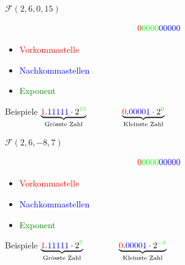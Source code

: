 \ifnum\conditionmacro=1 \documentclass[handout,usenames,dvipsnames]{beamer}\fi
\begin{document}

\begin{frame}{$\mathcal{F}(2,6,0,15)$}
\begin{Huge}
\[{\color{red}{0}}{\color{green}{0000}}{\color{blue}{00000}}\]
\end{Huge}
\begin{itemize}
\item\textcolor{red}{Vorkommastelle}
\item\textcolor{blue}{Nachkommastellen}
\item\textcolor{green}{Exponent}
\end{itemize}
\begin{block}{Beispiele}
$\underbrace{\textcolor{red}{1}.\textcolor{blue}{11111}\cdot 2^{\textcolor{green}{15}}}_\text{Grösste Zahl}\qquad\qquad\underbrace{\textcolor{red}{0}.\textcolor{blue}{00001}\cdot 2^{\textcolor{green}{0}}}_\text{Kleinste Zahl}$
\end{block}
\end{frame}


\begin{frame}{$\mathcal{F}(2,6,-8,7)$}
\begin{Huge}
\[{\color{red}{0}}{\color{green}{0000}}{\color{blue}{00000}}\]
\end{Huge}
\begin{itemize}
\item\textcolor{red}{Vorkommastelle}
\item\textcolor{blue}{Nachkommastellen}
\item\textcolor{green}{Exponent}
\end{itemize}
\begin{block}{Beispiele}
$\underbrace{\textcolor{red}{1}.\textcolor{blue}{11111}\cdot 2^{\textcolor{green}{7}}}_\text{Grösste Zahl}\qquad\qquad\underbrace{\textcolor{red}{0}.\textcolor{blue}{00001}\cdot 2^{\textcolor{green}{-8}}}_\text{Kleinste Zahl}$
\end{block}
\end{frame}

\end{document}

